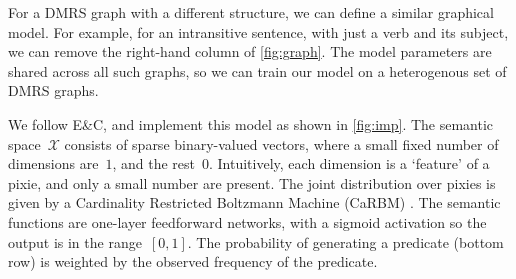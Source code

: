\documentclass[11pt]{article}
\begin{document}
For a DMRS graph with a different structure,
we can define a similar graphical model.
For example, for an intransitive sentence,
with just a verb and its subject,
we can remove the right-hand column of \cref{fig:graph}.
The model parameters are shared across all such graphs,
so we can train our model on a heterogenous set of DMRS graphs.

We follow E\&C, and implement this model as shown in \cref{fig:imp}.
The semantic space~$\mathcal{X}$ consists of sparse binary-valued vectors,
where a small fixed number of dimensions are~$1$, and the rest~$0$.
Intuitively, each dimension is a `feature' of a pixie,
and only a small number are present.
The joint distribution over pixies is given by a
Cardinality Restricted Boltzmann Machine (CaRBM) \cite{swersky2012carbm}.
The semantic functions are one-layer feedforward networks,
with a sigmoid activation so the output is in the range~$[0,1]$.
The probability of generating a predicate (bottom row)
is weighted by the observed frequency of the predicate.
\end{document}
